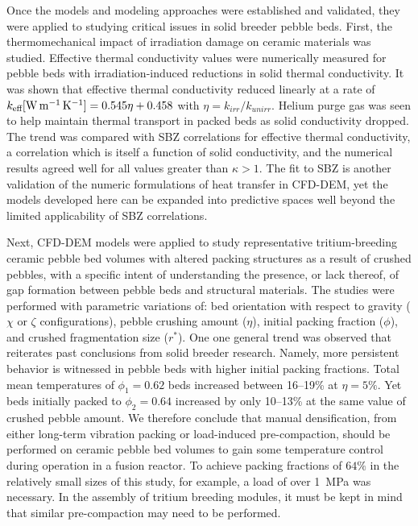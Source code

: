 Once the models and modeling approaches were established and validated, they were applied to studying critical issues in solid breeder pebble beds. First, the thermomechanical impact of irradiation damage on ceramic materials was studied. Effective thermal conductivity values were numerically measured for pebble beds with irradiation-induced reductions in solid thermal conductivity. It was shown that effective thermal conductivity reduced linearly at a rate of $k_\text{eff} [\si{\watt\per\meter\per\kelvin}] = 0.545 \eta + 0.458$ with $\eta = k_{irr}/k_{unirr}$. Helium purge gas was seen to help maintain thermal transport in packed beds as solid conductivity dropped. The trend was compared with SBZ correlations for effective thermal conductivity, a correlation which is itself a function of solid conductivity, and the numerical results agreed well for all values greater than $\kappa > 1$. The fit to SBZ is another validation of the numeric formulations of heat transfer in CFD-DEM, yet the models developed here can be expanded into predictive spaces well beyond the limited applicability of SBZ correlations.

Next, CFD-DEM models were applied to study representative tritium-breeding ceramic pebble bed volumes with altered packing structures as a result of crushed pebbles, with a specific intent of understanding the presence, or lack thereof, of gap formation between pebble beds and structural materials. The studies were performed with parametric variations of: bed orientation with respect to gravity ($\chi$ or $\zeta$ configurations), pebble crushing amount ($\eta$), initial packing fraction ($\phi$), and crushed fragmentation size ($r^*$). One one general trend was observed that reiterates past conclusions from solid breeder research. Namely, more persistent behavior is witnessed in pebble beds with higher initial packing fractions. Total mean temperatures of $\phi_1 = 0.62$ beds increased between \numrange{16}{19}\% at $\eta = 5\%$. Yet beds initially packed to $\phi_2 = 0.64$ increased by only \numrange{10}{13}\% at the same value of crushed pebble amount. We therefore conclude that manual densification, from either long-term vibration packing or load-induced pre-compaction, should be performed on ceramic pebble bed volumes to gain some temperature control during operation in a fusion reactor. To achieve packing fractions of $64\%$ in the relatively small sizes of this study, for example, a load of over \SI{1}{\mega\pascal} was necessary. In the assembly of tritium breeding modules, it must be kept in mind that similar pre-compaction may need to be performed.

